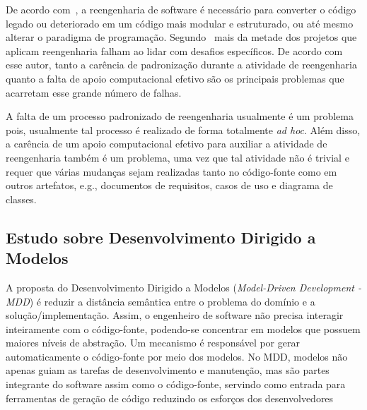 De acordo com~\citet{chikofskyTax}, a reengenharia de software  é necessário para converter o código legado ou deteriorado em um código mais modular e estruturado, ou até mesmo alterar o paradigma de programação. Segundo~\citet{Sneed:2005} mais da metade dos projetos que aplicam reengenharia falham ao lidar com desafios específicos. De acordo com esse autor, tanto a carência de  padronização durante a atividade de reengenharia quanto a falta de apoio computacional efetivo são os principais problemas que acarretam esse grande número de falhas.  

A falta de um processo padronizado de reengenharia usualmente é um problema pois, usualmente tal processo é realizado de forma totalmente \textit{ad hoc}. Além disso, a carência de um apoio computacional efetivo para auxiliar a atividade de reengenharia também é um problema, uma vez que tal atividade não é trivial e requer que várias mudanças sejam realizadas tanto no código-fonte como em outros artefatos, e.g., documentos de requisitos, casos de uso e diagrama de classes. 


\subsection{Estudo sobre Desenvolvimento Dirigido a Modelos} %
\label{sub:desenvolvimento_dirigido_a_modelos}

A proposta do Desenvolvimento Dirigido a Modelos (\textit{Model-Driven Development - MDD}) é reduzir a distância semântica entre o problema do domínio e a solução/implementação. Assim, o engenheiro de software não precisa interagir inteiramente com o código-fonte, podendo-se concentrar em modelos que possuem maiores níveis de abstração. Um mecanismo é responsável por gerar automaticamente o código-fonte por meio dos modelos. No MDD, modelos não apenas guiam as tarefas de desenvolvimento e manutenção, mas são partes integrante do software assim como o código-fonte, servindo como entrada para ferramentas de geração de código reduzindo os esforços dos desenvolvedores~\cite{Bittar, Kleppe:2003}


